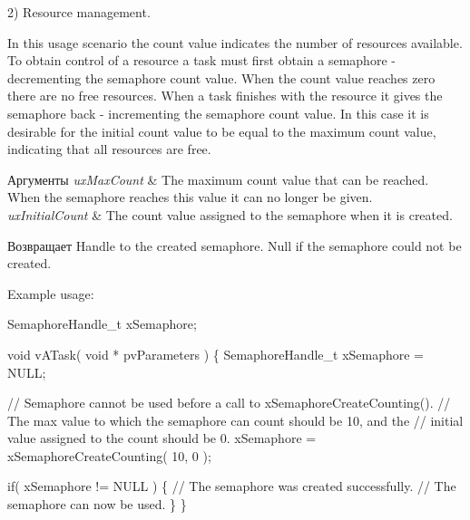 2) Resource management.

In this usage scenario the count value indicates the number of resources available. To obtain control of a resource a task must first obtain a semaphore -\/ decrementing the semaphore count value. When the count value reaches zero there are no free resources. When a task finishes with the resource it \textquotesingle{}gives\textquotesingle{} the semaphore back -\/ incrementing the semaphore count value. In this case it is desirable for the initial count value to be equal to the maximum count value, indicating that all resources are free.


\begin{DoxyParams}{Аргументы}
{\em ux\+Max\+Count} & The maximum count value that can be reached. When the semaphore reaches this value it can no longer be \textquotesingle{}given\textquotesingle{}.\\
\hline
{\em ux\+Initial\+Count} & The count value assigned to the semaphore when it is created.\\
\hline
\end{DoxyParams}
\begin{DoxyReturn}{Возвращает}
Handle to the created semaphore. Null if the semaphore could not be created.
\end{DoxyReturn}
Example usage\+: 
\begin{DoxyPre}
SemaphoreHandle\_t xSemaphore;\end{DoxyPre}



\begin{DoxyPre}void vATask( void * pvParameters )
\{
SemaphoreHandle\_t xSemaphore = NULL;\end{DoxyPre}



\begin{DoxyPre}   // Semaphore cannot be used before a call to xSemaphoreCreateCounting().
   // The max value to which the semaphore can count should be 10, and the
   // initial value assigned to the count should be 0.
   xSemaphore = xSemaphoreCreateCounting( 10, 0 );\end{DoxyPre}



\begin{DoxyPre}   if( xSemaphore != NULL )
   \{
       // The semaphore was created successfully.
       // The semaphore can now be used.
   \}
\}
\end{DoxyPre}
 